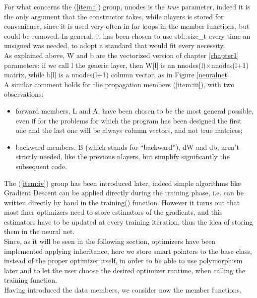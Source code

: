 \documentclass[12pt, a4paper]{report}
\theoremstyle{definition}
\begin{document}
For what concerns the (\ref{item:i}) group, {\ttfamily nnodes} is the \textit{true} parameter, indeed it is the only argument that the constructor takes, while {\ttfamily nlayers} is stored for convenience, since it is used very often in for loops in the member functions, but could be removed. In general, it has been chosen to use {\ttfamily std::size\_t} every time an unsigned was needed, to adopt a standard that would fit every necessity.\\
As explained above, {\ttfamily W} and {\ttfamily b} are the vectorized version of chapter \ref{chapter1} parameters: if we call {\ttfamily l} the generic layer, then {\ttfamily W[l]} is an {\ttfamily nnodes(l)}$\times${\ttfamily nnodes(l+1)} matrix, while {\ttfamily b[l]} is a {\ttfamily nnodes(l+1)} column vector, as in Figure \ref{neuralnet}.\\
A similar comment holds for the propagation members (\ref{item:iii}), with two observations:
\begin{itemize}
	\item forward members, {\ttfamily L} and {\ttfamily A}, have been chosen to be the most general possible, even if for the problems for which the program has been designed the first one and the last one will be always column vectors, and not true matrices;
	\item backward members, {\ttfamily B} (which stands for ``backward''), {\ttfamily dW} and {\ttfamily db}, aren't strictly needed, like the previous {\ttfamily nlayers}, but simplify significantly the subsequent code.
\end{itemize}
The (\ref{item:iv}) group has been introduced later, indeed simple algorithms like Gradient Descent can be applied directly during the training phase, i.e. can be written directly by hand in the {\ttfamily training()} function. However it turns out that most finer optimizers need to store estimators of the gradients, and this estimators have to be updated at every training iteration, thus the idea of storing them in the neural net.\\
Since, as it will be seen in the following section, optimizers have been implemented applying inheritance, here we store smart pointers to the base class, instead of the proper optimizer itself, in order to be able to use polymorphism later and to let the user choose the desired optimizer runtime, when calling the training function.\\
\newpage \noindent
Having introduced the data members, we consider now the member functions.\\
\end{document}
